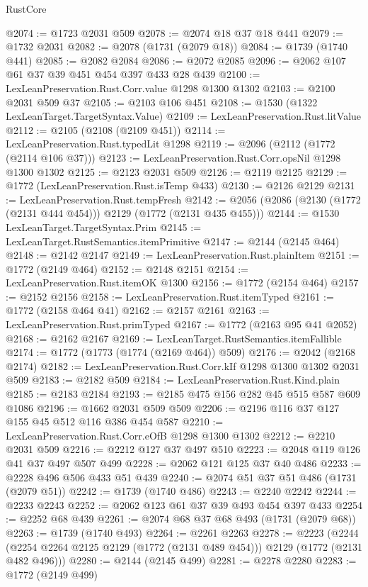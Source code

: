\begin{lexlean}{RustCore}
\begin{coremodule}
@2074 := @1723 @2031 @509
@2078 := @2074 @18 @37 @18 @441
@2079 := @1732 @2031
@2082 := @2078 (@1731 (@2079 @18))
@2084 := @1739 (@1740 @441)
@2085 := @2082 @2084
@2086 := @2072 @2085
@2096 := @2062 @107 @61 @37 @39 @451 @454 @397 @433 @28 @439
@2100 := LexLeanPreservation.Rust.Corr.value @1298 @1300 @1302
@2103 := @2100 @2031 @509 @37
@2105 := @2103 @106 @451
@2108 := @1530 (@1322 LexLeanTarget.TargetSyntax.Value)
@2109 := LexLeanPreservation.Rust.litValue
@2112 := @2105 (@2108 (@2109 @451))
@2114 := LexLeanPreservation.Rust.typedLit @1298
@2119 := @2096 (@2112 (@1772 (@2114 @106 @37)))
@2123 := LexLeanPreservation.Rust.Corr.opsNil @1298 @1300 @1302
@2125 := @2123 @2031 @509
@2126 := @2119 @2125
@2129 := @1772 (LexLeanPreservation.Rust.isTemp @433)
@2130 := @2126 @2129
@2131 := LexLeanPreservation.Rust.tempFresh
@2142 := @2056 (@2086 (@2130 (@1772 (@2131 @444 @454))) @2129 (@1772 (@2131 @435 @455)))
@2144 := @1530 LexLeanTarget.TargetSyntax.Prim
@2145 := LexLeanTarget.RustSemantics.itemPrimitive
@2147 := @2144 (@2145 @464)
@2148 := @2142 @2147
@2149 := LexLeanPreservation.Rust.plainItem
@2151 := @1772 (@2149 @464)
@2152 := @2148 @2151
@2154 := LexLeanPreservation.Rust.itemOK @1300
@2156 := @1772 (@2154 @464)
@2157 := @2152 @2156
@2158 := LexLeanPreservation.Rust.itemTyped
@2161 := @1772 (@2158 @464 @41)
@2162 := @2157 @2161
@2163 := LexLeanPreservation.Rust.primTyped
@2167 := @1772 (@2163 @95 @41 @2052)
@2168 := @2162 @2167
@2169 := LexLeanTarget.RustSemantics.itemFallible
@2174 := @1772 (@1773 (@1774 (@2169 @464)) @509)
@2176 := @2042 (@2168 @2174)
@2182 := LexLeanPreservation.Rust.Corr.kIf @1298 @1300 @1302 @2031 @509
@2183 := @2182 @509
@2184 := LexLeanPreservation.Rust.Kind.plain
@2185 := @2183 @2184
@2193 := @2185 @475 @156 @282 @45 @515 @587 @609 @1086
@2196 := @1662 @2031 @509 @509
@2206 := @2196 @116 @37 @127 @155 @45 @512 @116 @386 @454 @587
@2210 := LexLeanPreservation.Rust.Corr.eOfB @1298 @1300 @1302
@2212 := @2210 @2031 @509
@2216 := @2212 @127 @37 @497 @510
@2223 := @2048 @119 @126 @41 @37 @497 @507 @499
@2228 := @2062 @121 @125 @37 @40 @486
@2233 := @2228 @496 @506 @433 @51 @439
@2240 := @2074 @51 @37 @51 @486 (@1731 (@2079 @51))
@2242 := @1739 (@1740 @486)
@2243 := @2240 @2242
@2244 := @2233 @2243
@2252 := @2062 @123 @61 @37 @39 @493 @454 @397 @433
@2254 := @2252 @68 @439
@2261 := @2074 @68 @37 @68 @493 (@1731 (@2079 @68))
@2263 := @1739 (@1740 @493)
@2264 := @2261 @2263
@2278 := @2223
    (@2244 (@2254 @2264 @2125 @2129 (@1772 (@2131 @489 @454))) @2129 (@1772 (@2131 @482 @496)))
@2280 := @2144 (@2145 @499)
@2281 := @2278 @2280
@2283 := @1772 (@2149 @499)

\end{coremodule}
\end{lexlean}
